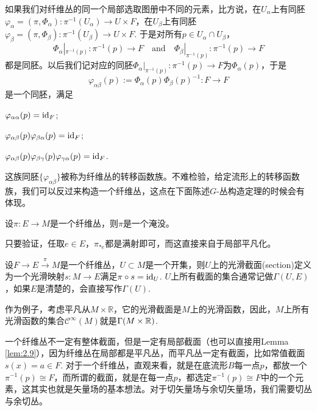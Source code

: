 \begin{para}[转移函数]
如果我们对纤维丛的同一个局部选取图册中不同的元素，比方说，在$U_\alpha$上有同胚$\varphi_\alpha=(\pi,\Phi_\alpha):\pi^{-1}(U_\alpha)\to U\times F$，在$U_\beta$上有同胚$\varphi_\beta=(\pi,\Phi_\beta):\pi^{-1}(U_\beta)\to U\times F$. 于是对所有$p\in U_\alpha\cap U_\beta$，
\[
	\Phi_{\alpha}|_{\pi^{-1}(p)}:\pi^{-1}(p)\to F\quad \text{and}\quad \Phi_{\beta}|_{\pi^{-1}(p)}:\pi^{-1}(p)\to F
\]
都是同胚。以后我们记对应的同胚$\Phi_{\alpha}|_{\pi^{-1}(p)}:\pi^{-1}(p)\to F$为$\Phi_\alpha(p)$，于是
\[
	\varphi_{\alpha\beta}(p):=\Phi_{\alpha}(p)\Phi_{\beta}(p)^{-1}:F\to F
\]
是一个同胚，满足
\begin{compactenum}
	\item $\varphi_{\alpha\alpha}(p)=\operatorname{id}_F$;
	\item $\varphi_{\alpha\beta}(p)\varphi_{\beta\alpha}(p)=\operatorname{id}_F$;
	\item $\varphi_{\alpha\beta}(p)\varphi_{\beta\gamma}(p)\varphi_{\gamma\alpha}(p)=\operatorname{id}_F$.
\end{compactenum}
这族同胚$\{\varphi_{\alpha\beta}\}$被称为纤维丛的转移函数族。不难检验，给定流形上的转移函数族，我们可以反过来构造一个纤维丛，这点在下面陈述$G$-丛构造定理的时候会有体现。
\end{para}

\begin{lem}
设$\pi:E\to M$是一个纤维丛，则$\pi$是一个淹没。
\end{lem}

只要验证，任取$e\in E$，$\pi_{*e}$都是满射即可，而这直接来自于局部平凡化。

\begin{para}[截面]
设$F\to E\xrightarrow{\pi} M$是一个纤维丛，$U\subset M$是一个开集，则$U$上的光滑截面(section)定义为一个光滑映射$s:M\to E$满足$\pi\circ s=\operatorname{id}_U$. $U$上所有截面的集合通常记做$\Gamma(U,E)$，如果$E$是清楚的，会直接写作$\Gamma(U)$. 
\end{para}

作为例子，考虑平凡从$M\times \mathbb{R}$，它的光滑截面是$M$上的光滑函数，因此，$M$上所有光滑函数的集合$\mathcal{C}^\infty(M)$就是$\Gamma(M\times \mathbb{R})$.

一个纤维丛不一定有整体截面，但是一定有局部截面（也可以直接用Lemma \ref{lem:2.9}），因为纤维丛在局部都是平凡丛，而平凡丛一定有截面，比如常值截面$s(x)=a\in F$. 对于一个纤维丛，直观来看，就是在底流形$B$每一点$p$，都放一个$\pi^{-1}(p)\cong F$，而所谓的截面，就是在每一点$p$，都选定$\pi^{-1}(p)\cong F$中的一个元素，这其实也就是矢量场的基本想法。对于切矢量场与余切矢量场，我们需要切丛与余切丛。

